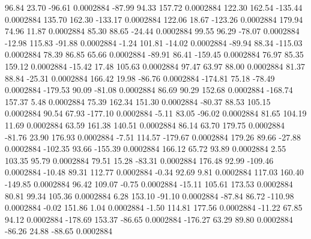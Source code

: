        96.84       23.70      -96.61     0.0002884
      -87.99       94.33      157.72     0.0002884
      122.30      162.54     -135.44     0.0002884
      135.70      162.30     -133.17     0.0002884
      122.06       18.67     -123.26     0.0002884
      179.94       74.96       11.87     0.0002884
       85.30       88.65      -24.44     0.0002884
       99.55       96.29      -78.07     0.0002884
      -12.98      115.83      -91.88     0.0002884
       -1.24      101.81      -14.02     0.0002884
      -89.94       88.34     -115.03     0.0002884
       78.39       86.85       65.66     0.0002884
      -89.91       86.41     -159.45     0.0002884
       76.97       85.35      159.12     0.0002884
      -15.42       17.48      105.63     0.0002884
       97.47       63.97       88.00     0.0002884
       81.37       88.84      -25.31     0.0002884
      166.42       19.98      -86.76     0.0002884
     -174.81       75.18      -78.49     0.0002884
     -179.53       90.09      -81.08     0.0002884
       86.69       90.29      152.68     0.0002884
     -168.74      157.37        5.48     0.0002884
       75.39      162.34      151.30     0.0002884
      -80.37       88.53      105.15     0.0002884
       90.54       67.93     -177.10     0.0002884
       -5.11       83.05      -96.02     0.0002884
       81.65      104.19       11.69     0.0002884
       63.59      161.38      140.51     0.0002884
       86.14       63.70      179.75     0.0002884
      -81.76       23.90      176.93     0.0002884
       -7.51      114.57     -179.67     0.0002884
      179.26       89.66      -27.88     0.0002884
     -102.35       93.66     -155.39     0.0002884
      166.12       65.72       93.89     0.0002884
        2.55      103.35       95.79     0.0002884
       79.51       15.28      -83.31     0.0002884
      176.48       92.99     -109.46     0.0002884
      -10.48       89.31      112.77     0.0002884
       -0.34       92.69        9.81     0.0002884
      117.03      160.40     -149.85     0.0002884
       96.42      109.07       -0.75     0.0002884
      -15.11      105.61      173.53     0.0002884
       80.81       99.34      105.36     0.0002884
        6.28      153.10      -91.10     0.0002884
      -87.84       86.72     -110.98     0.0002884
       -0.02      151.86        1.04     0.0002884
       -1.50      114.81      177.56     0.0002884
      -11.22       67.85       94.12     0.0002884
     -178.69      153.37      -86.65     0.0002884
     -176.27       63.29       89.80     0.0002884
      -86.26       24.88      -88.65     0.0002884
